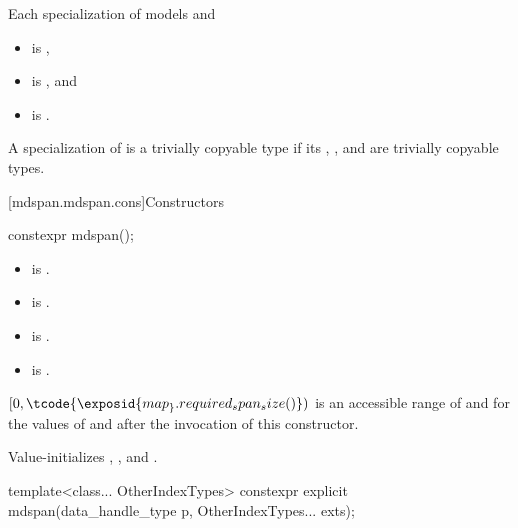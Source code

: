 \pnum
Each specialization  of  models  and
\begin{itemize}
\item
{} is ,
\item
{} is , and
\item
{} is .
\end{itemize}

\pnum
A specialization of  is a trivially copyable type if
its , , and 
are trivially copyable types.

[mdspan.mdspan.cons]{Constructors}

%
\begin{itemdecl}
constexpr mdspan();
\end{itemdecl}

\begin{itemdescr}
\pnum
\constraints
\begin{itemize}
\item
{} is .
\item
{} is .
\item
{} is .
\item
{} is .
\end{itemize}

\pnum
\expects
$[0, \tcode{\exposid{map_}.required_span_size()})$ is
an accessible range of  and 
for the values of  and 
after the invocation of this constructor.

\pnum
\effects
Value-initializes , , and .
\end{itemdescr}

%
\begin{itemdecl}
template<class... OtherIndexTypes>
  constexpr explicit mdspan(data_handle_type p, OtherIndexTypes... exts);
\end{itemdecl}

